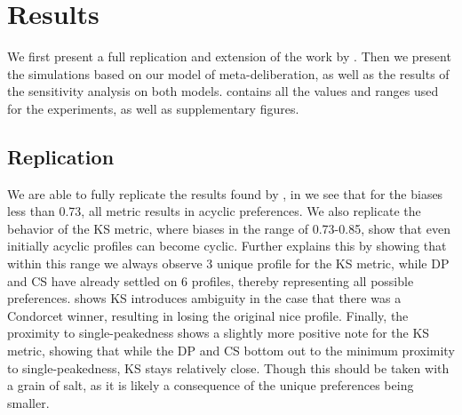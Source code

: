 \newpage
\chapter{Results}
\label{experiment_results}
We first present a full replication and extension of the work by
\citet{radDeliberationSinglePeakednessCoherent2021}. Then we present the simulations based on our model of
meta-deliberation, as well as the results of the sensitivity analysis on both
models.  contains all the values and ranges used for the experiments, as well as supplementary figures.


\section{Replication}\label{sec: replication} We are able to fully replicate the results found by
\citet{radDeliberationSinglePeakednessCoherent2021},  in 
we see that for the biases less than 0.73, all metric results in acyclic
preferences. We also replicate the behavior of the KS metric, where biases in
the range of 0.73-0.85, show that even initially acyclic profiles can become
cyclic.  Further explains this by showing that within this
range we always observe 3 unique profile for the KS metric, while DP and CS
have already settled on 6 profiles, thereby representing all possible
preferences.  shows KS introduces ambiguity in the case
that there was a Condorcet winner, resulting in losing the original nice
profile. Finally, the proximity to single-peakedness shows a slightly more
positive note for the KS metric, showing that while the DP and CS bottom out to
the minimum proximity to single-peakedness, KS stays relatively close. Though
this should be taken with a grain of salt, as it is likely a consequence of the
unique preferences being smaller.

